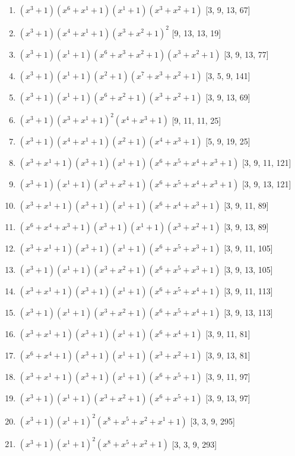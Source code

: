 \documentclass[10pt,twocolumn]{article}
\begin{document}
\begin{enumerate}
\item $(x^{3} + 1)(x^{6} + x^{1} + 1)(x^{1} + 1)(x^{3} + x^{2} + 1)$  [3, 9, 13, 67]
\item $(x^{3} + 1)(x^{4} + x^{1} + 1)(x^{3} + x^{2} + 1)^{2}$  [9, 13, 13, 19]
\item $(x^{3} + 1)(x^{1} + 1)(x^{6} + x^{3} + x^{2} + 1)(x^{3} + x^{2} + 1)$  [3, 9, 13, 77]
\item $(x^{3} + 1)(x^{1} + 1)(x^{2} + 1)(x^{7} + x^{3} + x^{2} + 1)$  [3, 5, 9, 141]
\item $(x^{3} + 1)(x^{1} + 1)(x^{6} + x^{2} + 1)(x^{3} + x^{2} + 1)$  [3, 9, 13, 69]
\item $(x^{3} + 1)(x^{3} + x^{1} + 1)^{2}(x^{4} + x^{3} + 1)$  [9, 11, 11, 25]
\item $(x^{3} + 1)(x^{4} + x^{1} + 1)(x^{2} + 1)(x^{4} + x^{3} + 1)$  [5, 9, 19, 25]
\item $(x^{3} + x^{1} + 1)(x^{3} + 1)(x^{1} + 1)(x^{6} + x^{5} + x^{4} + x^{3} + 1)$  [3, 9, 11, 121]
\item $(x^{3} + 1)(x^{1} + 1)(x^{3} + x^{2} + 1)(x^{6} + x^{5} + x^{4} + x^{3} + 1)$  [3, 9, 13, 121]
\item $(x^{3} + x^{1} + 1)(x^{3} + 1)(x^{1} + 1)(x^{6} + x^{4} + x^{3} + 1)$  [3, 9, 11, 89]
\item $(x^{6} + x^{4} + x^{3} + 1)(x^{3} + 1)(x^{1} + 1)(x^{3} + x^{2} + 1)$  [3, 9, 13, 89]
\item $(x^{3} + x^{1} + 1)(x^{3} + 1)(x^{1} + 1)(x^{6} + x^{5} + x^{3} + 1)$  [3, 9, 11, 105]
\item $(x^{3} + 1)(x^{1} + 1)(x^{3} + x^{2} + 1)(x^{6} + x^{5} + x^{3} + 1)$  [3, 9, 13, 105]
\item $(x^{3} + x^{1} + 1)(x^{3} + 1)(x^{1} + 1)(x^{6} + x^{5} + x^{4} + 1)$  [3, 9, 11, 113]
\item $(x^{3} + 1)(x^{1} + 1)(x^{3} + x^{2} + 1)(x^{6} + x^{5} + x^{4} + 1)$  [3, 9, 13, 113]
\item $(x^{3} + x^{1} + 1)(x^{3} + 1)(x^{1} + 1)(x^{6} + x^{4} + 1)$  [3, 9, 11, 81]
\item $(x^{6} + x^{4} + 1)(x^{3} + 1)(x^{1} + 1)(x^{3} + x^{2} + 1)$  [3, 9, 13, 81]
\item $(x^{3} + x^{1} + 1)(x^{3} + 1)(x^{1} + 1)(x^{6} + x^{5} + 1)$  [3, 9, 11, 97]
\item $(x^{3} + 1)(x^{1} + 1)(x^{3} + x^{2} + 1)(x^{6} + x^{5} + 1)$  [3, 9, 13, 97]
\item $(x^{3} + 1)(x^{1} + 1)^{2}(x^{8} + x^{5} + x^{2} + x^{1} + 1)$  [3, 3, 9, 295]
\item $(x^{3} + 1)(x^{1} + 1)^{2}(x^{8} + x^{5} + x^{2} + 1)$  [3, 3, 9, 293]

\end{enumerate}
\end{document}
